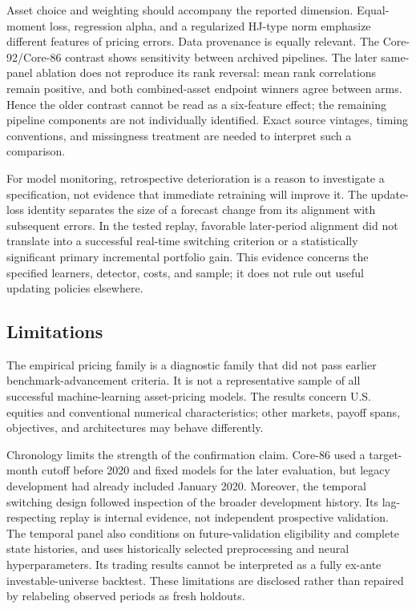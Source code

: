 Asset choice and weighting should accompany the reported dimension. Equal-moment loss, regression alpha, and a regularized HJ-type norm emphasize different features of pricing errors. Data provenance is equally relevant. The Core-92/Core-86 contrast shows sensitivity between archived pipelines. The later same-panel ablation does not reproduce its rank reversal: mean rank correlations remain positive, and both combined-asset endpoint winners agree between arms. Hence the older contrast cannot be read as a six-feature effect; the remaining pipeline components are not individually identified. Exact source vintages, timing conventions, and missingness treatment are needed to interpret such a comparison.

For model monitoring, retrospective deterioration is a reason to investigate a specification, not evidence that immediate retraining will improve it. The update-loss identity separates the size of a forecast change from its alignment with subsequent errors. In the tested replay, favorable later-period alignment did not translate into a successful real-time switching criterion or a statistically significant primary incremental portfolio gain. This evidence concerns the specified learners, detector, costs, and sample; it does not rule out useful updating policies elsewhere.

\subsection{Limitations}

The empirical pricing family is a diagnostic family that did not pass earlier benchmark-advancement criteria. It is not a representative sample of all successful machine-learning asset-pricing models. The results concern U.S. equities and conventional numerical characteristics; other markets, payoff spans, objectives, and architectures may behave differently.

Chronology limits the strength of the confirmation claim. Core-86 used a target-month cutoff before 2020 and fixed models for the later evaluation, but legacy development had already included January 2020. Moreover, the temporal switching design followed inspection of the broader development history. Its lag-respecting replay is internal evidence, not independent prospective validation. The temporal panel also conditions on future-validation eligibility and complete state histories, and uses historically selected preprocessing and neural hyperparameters. Its trading results cannot be interpreted as a fully ex-ante investable-universe backtest. These limitations are disclosed rather than repaired by relabeling observed periods as fresh holdouts.

